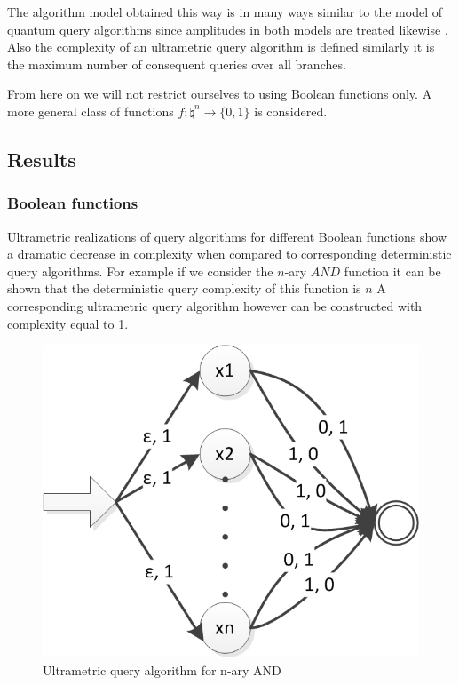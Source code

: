 \documentclass{llncs}
\begin{document}
The algorithm model obtained this way is in many ways similar to the model of quantum query algorithms since amplitudes in both models are treated likewise \cite{Amb02} \cite{Vas10}. Also the complexity of an ultrametric query algorithm is defined similarly it is the maximum number of consequent queries over all branches.

From here on we will not restrict ourselves to using Boolean functions only. A more general class of functions $f:\natural^n \rightarrow \{0,1\}$ is considered.

\subsection{Results}
\subsubsection{Boolean functions}
Ultrametric realizations of query algorithms for different Boolean functions show a dramatic decrease in complexity when compared to corresponding deterministic query algorithms. For example if we consider the $n$-ary $AND$ function it can be shown that the deterministic query complexity of this function is $n$ A corresponding ultrametric query algorithm however can be constructed with complexity equal to 1.

\begin{figure}
	\centering
	\includegraphics{n-and.png}
	\caption{Ultrametric query algorithm for n-ary AND}
	  \label{n_and}
\end{figure}
\end{document}
